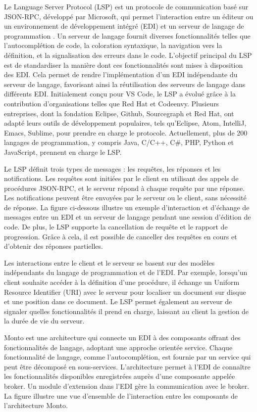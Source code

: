 Le Language Server Protocol (LSP) est un protocole de communication basé sur JSON-RPC, développé par Microsoft, qui permet l'interaction entre un éditeur ou un environnement de développement intégré (EDI) et un serveur de langage de programmation \cite{Keidel2016}. Un serveur de langage fournit diverses fonctionnalités telles que l'autocomplétion de code, la coloration syntaxique, la navigation vers la définition, et la signalisation des erreurs dans le code. L'objectif principal du LSP est de standardiser la manière dont ces fonctionnalités sont mises à disposition des EDI. Cela permet de rendre l'implémentation d'un EDI indépendante du serveur de langage, favorisant ainsi la réutilisation des serveurs de langage dans différents EDI. Initialement conçu pour VS Code, le LSP a évolué grâce à la contribution d'organisations telles que Red Hat et Codeenvy. Plusieurs entreprises, dont la fondation Eclipse, Github, Sourcegraph et Red Hat, ont adapté leurs outils de développement populaires, tels qu'Eclipse, Atom, IntelliJ, Emacs, Sublime, pour prendre en charge le protocole. Actuellement, plus de 200 langages de programmation, y compris Java, C/C++, C\#, PHP, Python et JavaScript, prennent en charge le LSP.

Le LSP définit trois types de messages : les requêtes, les réponses et les notifications. Les requêtes sont initiées par le client en utilisant des appels de procédures JSON-RPC, et le serveur répond à chaque requête par une réponse. Les notifications peuvent être envoyées par le serveur ou le client, sans nécessité de réponse. La figure ci-dessous illustre un exemple d'interaction et d'échange de messages entre un EDI et un serveur de langage pendant une session d'édition de code. De plus, le LSP supporte la cancellation de requête et le rapport de progression. Grâce à cela, il est possible de canceller des requêtes en cours et d'obtenir des réponses partielles.

Les interactions entre le client et le serveur se basent sur des modèles indépendants du langage de programmation et de l'EDI. Par exemple, lorsqu'un client souhaite accéder à la définition d'une procédure, il échange un Uniform Resource Identifier (URI) avec le serveur pour localiser un document sur disque et une position dans ce document. Le LSP permet également au serveur de signaler quelles fonctionnalités il prend en charge, laissant au client la gestion de la durée de vie du serveur.

Monto est une architecture qui connecte un EDI à des composants offrant des fonctionnalités de langage, adoptant une approche orientée service. Chaque fonctionnalité de langage, comme l'autocomplétion, est fournie par un service qui peut être décomposé en sous-services. L'architecture permet à l'EDI de connaître les fonctionnalités disponibles enregistrées auprès d'une composante appelée broker. Un module d'extension dans l'EDI gère la communication avec le broker. La figure illustre une vue d'ensemble de l'interaction entre les composants de l'architecture Monto.

